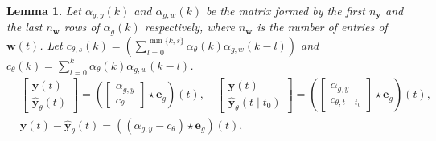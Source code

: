 \documentclass{article}
\def\rvu{{\mathbf{i}}}
\def\rvu{{\mathbf{u}}}
\def\rvw{{\mathbf{w}}}
\def\rvy{{\mathbf{y}}}
\newtheorem{lemma}[theorem]{Lemma}
\newcommand{\e}{\mathbf{e}}
\newcommand{\y}{\mathbf{y}}
\newcommand{\w}{\mathbf{w}}
\begin{document}
\begin{lemma}
\label{alpha:lemma2}
Let $\alpha_{g,y}(k)$ and $\alpha_{g,w}(k)$ be the matrix formed by the first $n_\rvy$ and the last $n_\rvw$ 
rows of $\alpha_g(k)$ respectively, where $n_{\rvw}$ is the number of entries of $\w(t)$. Let $c_{\theta,s}(k)=\left(\sum_{l=0}^{\min\{k,s\}} \alpha_{\theta}(k)\alpha_{g,w}(k-l)\right)$
and $c_{\theta}(k)=\sum_{l=0}^{k} \alpha_{\theta}(k)\alpha_{g,w}(k-l)$. 
\begin{equation}
\label{alpha:lemma:eq1}
\begin{aligned}
& \begin{bmatrix} \y(t)
    \\ \hat{\rvy}_{\theta}(t)
\end{bmatrix}=\left(\begin{bmatrix} \alpha_{g,y} \\ c_{\theta} \end{bmatrix} \star \e_g\right)(t), \quad  
\begin{bmatrix} \y(t) \\ \hat{\rvy}_{\theta}(t \mid t_0) \end{bmatrix}=\left(\begin{bmatrix} \alpha_{g,y} \\ c_{\theta,t-t_0} \end{bmatrix} \star \e_g\right)(t),   \\
& \y(t)-\hat{\rvy}_{\theta}(t) = ((\alpha_{g,y} - c_{\theta}) \star \e_g)(t), \quad

\end{aligned}
\end{equation}
\end{lemma}
\end{document}
